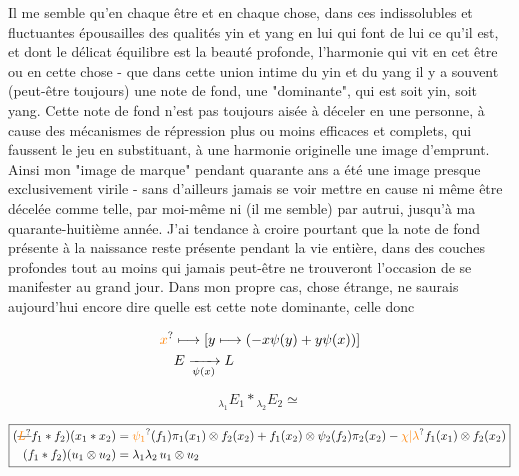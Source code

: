 Il me semble qu'en chaque être et en chaque chose, dans ces indissolubles et fluctuantes épousailles des qualités yin et yang en lui qui font de lui ce qu'il est, et dont le délicat équilibre est la beauté profonde, l'harmonie qui vit en cet être ou en cette chose - que dans cette union intime du yin et du yang il y a souvent (peut-être toujours) une note de fond, une "dominante", qui est soit yin, soit yang. Cette note de fond n'est pas toujours aisée à déceler en une personne, à cause des mécanismes de répression plus ou moins efficaces et complets, qui faussent le jeu en substituant, à une harmonie originelle une image d'emprunt. Ainsi mon "image de marque" pendant quarante ans a été une image presque exclusivement virile - sans d'ailleurs jamais se voir mettre en cause ni même être décelée comme telle, par moi-même ni (il me semble) par autrui, jusqu'à ma quarante-huitième année. J'ai tendance à croire pourtant que la note de fond présente à la naissance reste présente pendant la vie entière, dans des couches profondes tout au moins qui jamais peut-être ne trouveront l'occasion de se manifester au grand jour. Dans mon propre cas, chose étrange,  ne saurais aujourd'hui encore dire quelle est cette note dominante, celle donc



\[
\begin{aligned}
\unsure{x}&\longmapsto[y\longmapsto(-x\psi(y)+y\psi(x))]\\
&E\xrightarrow[\psi(x)]{}L
\end{aligned}
\]

\[
{}_{\lambda_1}E_1\ast{}_{\lambda_2}E_2\simeq
\]

\[
\boxed{\begin{aligned}
(\deleted{\unsure{L}}f_1\ast f_2)(x_1\ast x_2)
 &=\unsure{\psi_1}(f_1)\pi_1(x_1)\otimes f_2(x_2)
 + f_1(x_2)\otimes\psi_2(f_2)\pi_2(x_2)
 -\unsure{\chi|\lambda} f_1(x_1)\otimes f_2(x_2)\\
(f_1\ast f_2)(u_1\otimes u_2)&=\lambda_1\lambda_2\,u_1\otimes u_2
\end{aligned}}
\]

